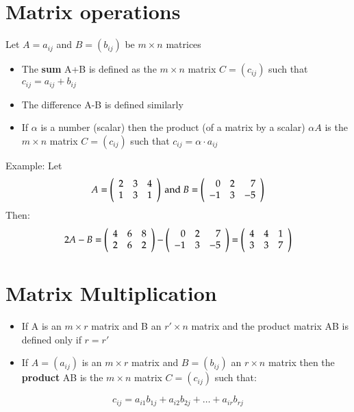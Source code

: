 \documentclass{article}[18pt]
\begin{document}
\section{Matrix operations}
Let $A=a_{ij}$ and $B=(b_{ij})$ be $m\times n$ matrices
\begin{itemize}
	\item The \textbf{sum} A+B is defined as the $m\times n$ matrix $C=(c_{ij})$ such that $c_{ij}=a_{ij}+b_{ij}$
	\item The difference A-B is defined similarly
	\item If $\alpha$ is a number (scalar) then the product (of a matrix by a scalar) $\alpha A$ is the $m\times n$ matrix $C=(c_{ij})$ such that $c_{ij}=\alpha\cdot a_{ij}$
\end{itemize}
Example: Let
$$A = \left( \begin{array} { c c c } { 2 } & { 3 } & { 4 } \\ { 1 } & { 3 } & { 1 } \end{array} \right) \text { and } B = \left( \begin{array} { r r r } { 0 } & { 2 } & { 7 } \\ { - 1 } & { 3 } & { - 5 } \end{array} \right)$$
Then:
$$2 A - B = \left( \begin{array} { c c c } { 4 } & { 6 } & { 8 } \\ { 2 } & { 6 } & { 2 } \end{array} \right) - \left( \begin{array} { r r r } { 0 } & { 2 } & { 7 } \\ { - 1 } & { 3 } & { - 5 } \end{array} \right) = \left( \begin{array} { c c c } { 4 } & { 4 } & { 1 } \\ { 3 } & { 3 } & { 7 } \end{array} \right)$$
\section{Matrix Multiplication}
\begin{itemize}
	\item If A is an $m\times r$ matrix and B an $r'\times n$ matrix and the product matrix AB is defined only if $r=r'$
	\item If $A=(a_{ij})$ is an $m\times r$ matrix and $B=(b_{ij})$ an $r\times n$ matrix then the \textbf{product} AB is the $m\times n$ matrix $C=(c_{ij})$ such that:
\end{itemize}
$$c _ { i j } = a _ { i 1 } b _ { 1 j } + a _ { i 2 } b _ { 2 j } + \ldots + a _ { i r } b _ { r j }$$
\end{document}
